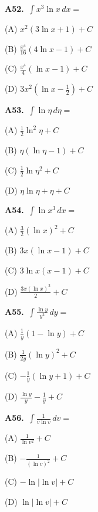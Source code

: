 \documentclass[11pt]{article}
\begin{document}
\bigskip\noindent\textbf{A52.}\ $\displaystyle\int x^3\ln x\,dx=$
\begin{list}{}{\setlength{\leftmargin}{3em}\setlength{\labelwidth}{2.5em}\setlength{\itemsep}{0pt}\setlength{\topsep}{2pt}}
\item[(A)] $x^2(3\ln x+1)+C$
\item[(B)] $\frac{x^4}{16}(4\ln x-1)+C$
\item[(C)] $\frac{x^4}4(\ln x-1)+C$
\item[(D)] $3x^2(\ln x-\frac12)+C$
\end{list}

\bigskip\noindent\textbf{A53.}\ $\displaystyle\int \ln\eta\,d\eta=$
\begin{list}{}{\setlength{\leftmargin}{3em}\setlength{\labelwidth}{2.5em}\setlength{\itemsep}{0pt}\setlength{\topsep}{2pt}}
\item[(A)] $\frac12\ln^2\eta+C$
\item[(B)] $\eta(\ln\eta-1)+C$
\item[(C)] $\frac12\ln\eta^2+C$
\item[(D)] $\eta\ln\eta+\eta+C$
\end{list}

\bigskip\noindent\textbf{A54.}\ $\displaystyle\int \ln x^3\,dx=$
\begin{list}{}{\setlength{\leftmargin}{3em}\setlength{\labelwidth}{2.5em}\setlength{\itemsep}{0pt}\setlength{\topsep}{2pt}}
\item[(A)] $\frac32(\ln x)^2+C$
\item[(B)] $3x(\ln x-1)+C$
\item[(C)] $3\ln x(x-1)+C$
\item[(D)] $\frac{3x(\ln x)^2}2+C$
\end{list}

\bigskip\noindent\textbf{A55.}\ $\displaystyle\int \frac{\ln y}{y^2}\,dy=$
\begin{list}{}{\setlength{\leftmargin}{3em}\setlength{\labelwidth}{2.5em}\setlength{\itemsep}{0pt}\setlength{\topsep}{2pt}}
\item[(A)] $\frac1y(1-\ln y)+C$
\item[(B)] $\frac1{2y}(\ln y)^2+C$
\item[(C)] $-\frac1y(\ln y+1)+C$
\item[(D)] $\frac{\ln y}y-\frac1y+C$
\end{list}

\bigskip\noindent\textbf{A56.}\ $\displaystyle\int \frac1{v\ln v}\,dv=$
\begin{list}{}{\setlength{\leftmargin}{3em}\setlength{\labelwidth}{2.5em}\setlength{\itemsep}{0pt}\setlength{\topsep}{2pt}}
\item[(A)] $\frac1{\ln v^2}+C$
\item[(B)] $-\frac1{(\ln v)^2}+C$
\item[(C)] $-\ln\lvert\ln v\rvert+C$
\item[(D)] $\ln\lvert\ln v\rvert+C$
\end{list}
\end{document}
